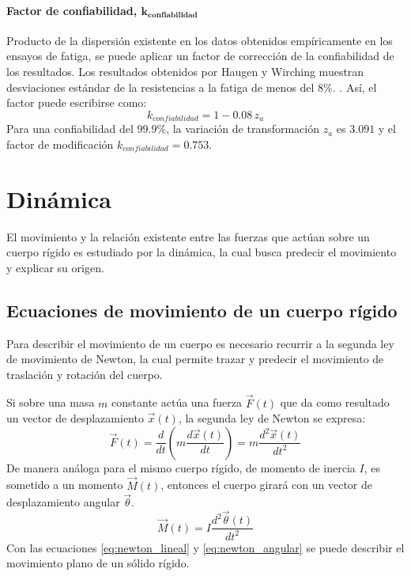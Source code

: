 \paragraph{Factor de confiabilidad, $\mathbf{k_{confiabilidad}}$}
Producto de la dispersión existente en los datos obtenidos empíricamente en los ensayos de fatiga, se puede aplicar un factor de corrección de la confiabilidad de los resultados. Los resultados obtenidos por Haugen y Wirching muestran desviaciones estándar de la resistencias a la fatiga de menos del 8\%. \cite{budynas2008shigley}. Así, el factor puede escribirse como:
\begin{equation}
	k_{confiabilidad} = 1 - 0.08\, z_a
\end{equation} 
Para una confiabilidad del $99.9\%$, la variación de transformación $z_a$ es $3.091$ y el factor de modificación $k_{confiabilidad} = 0.753$.

\section{Dinámica}

El movimiento y la relación existente entre las fuerzas que actúan sobre un cuerpo rígido es estudiado por la dinámica, la cual busca predecir el movimiento y explicar su origen. 

\subsection{Ecuaciones de movimiento de un cuerpo rígido}
\label{sec:ec_mov}
Para describir el movimiento de un cuerpo es necesario recurrir a la segunda ley de movimiento de Newton, la cual permite trazar y predecir el movimiento de traslación y rotación del cuerpo.

Si sobre una masa $m$ constante actúa una fuerza $\vec{F}(t)$ que da como resultado un vector de desplazamiento $\vec{x}(t)$, la segunda ley de Newton se expresa:
\begin{equation}\label{eq:newton_lineal}
	\vec{F}(t) = \frac{d}{dt}\left(m\frac{d\vec{x}(t)}{dt}\right) = m \frac{d^2\vec{x}(t)}{dt^2}
\end{equation}
De manera análoga para el mismo cuerpo rígido, de momento de inercia $I$, es sometido a un momento $\vec{M}(t)$, entonces el cuerpo girará con un vector de desplazamiento angular $\vec{\theta}$.
\begin{equation}\label{eq:newton_angular}
	\vec{M}(t) = I\frac{d^2\vec{\theta}(t)}{dt^2}
\end{equation} 
Con las ecuaciones \ref{eq:newton_lineal} y \ref{eq:newton_angular} se puede describir el movimiento plano de un sólido rígido.

